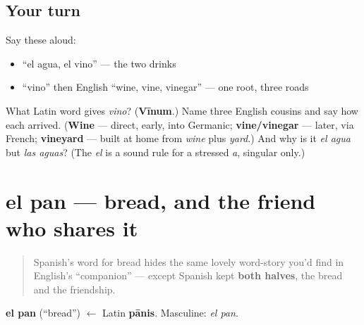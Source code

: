 \subsection*{Your turn}
Say these aloud:

\begin{itemize}
\raggedright
  \item \textquotedblleft{}el agua, el vino\textquotedblright{} — the two drinks
  \item \textquotedblleft{}vino\textquotedblright{} then English \textquotedblleft{}wine, vine, vinegar\textquotedblright{} — one root, three roads
\end{itemize}

\begin{tcolorbox}[breakable,colback=teal!4,colframe=teal!35!black,title={Before you move on}]
What Latin word gives \emph{vino}? (\textbf{Vīnum}.) Name three English cousins and say how each arrived. (\textbf{Wine} — direct, early, into Germanic; \textbf{vine/vinegar} — later, via French; \textbf{vineyard} — built at home from \emph{wine} plus \emph{yard}.) And why is it \emph{el agua} but \emph{las aguas}? (The \emph{el} is a sound rule for a stressed \emph{a}, singular only.)
\end{tcolorbox}
\section[el pan]{el pan — bread, and the friend who shares it}

\label{lesson:ES-C26-pan}



\begin{quote}
Spanish's word for bread hides the same lovely word-story you'd find in English's \textquotedblleft{}companion\textquotedblright{} — except Spanish kept \textbf{both halves}, the bread and the friendship.
\end{quote}

\begin{cousinweb}
\textbf{el pan} (\textquotedblleft{}bread\textquotedblright{}) $\leftarrow$ Latin \textbf{pānis}. Masculine: \emph{el pan}.
\end{cousinweb}

